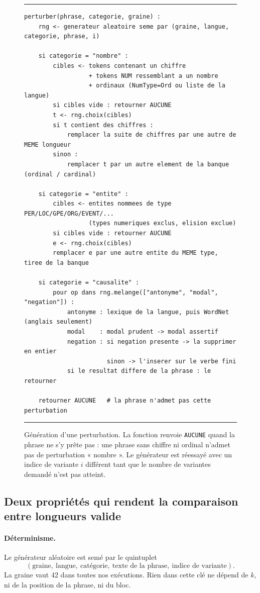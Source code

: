 \documentclass[11pt]{article}
\newcommand{\code}[1]{\texttt{\small #1}}
\begin{document}
\begin{figure}[t]
\small
\hrule\vspace{4pt}
\begin{verbatim}
perturber(phrase, categorie, graine) :
    rng <- generateur aleatoire seme par (graine, langue, categorie, phrase, i)

    si categorie = "nombre" :
        cibles <- tokens contenant un chiffre
                  + tokens NUM ressemblant a un nombre
                  + ordinaux (NumType=Ord ou liste de la langue)
        si cibles vide : retourner AUCUNE
        t <- rng.choix(cibles)
        si t contient des chiffres :
            remplacer la suite de chiffres par une autre de MEME longueur
        sinon :
            remplacer t par un autre element de la banque (ordinal / cardinal)

    si categorie = "entite" :
        cibles <- entites nommees de type PER/LOC/GPE/ORG/EVENT/...
                  (types numeriques exclus, elision exclue)
        si cibles vide : retourner AUCUNE
        e <- rng.choix(cibles)
        remplacer e par une autre entite du MEME type, tiree de la banque

    si categorie = "causalite" :
        pour op dans rng.melange(["antonyme", "modal", "negation"]) :
            antonyme : lexique de la langue, puis WordNet (anglais seulement)
            modal    : modal prudent -> modal assertif
            negation : si negation presente -> la supprimer en entier
                       sinon -> l'inserer sur le verbe fini
            si le resultat differe de la phrase : le retourner

    retourner AUCUNE   # la phrase n'admet pas cette perturbation
\end{verbatim}
\vspace{2pt}\hrule
\caption{Génération d'une perturbation. La fonction renvoie \code{AUCUNE} quand la phrase ne s'y prête pas : une phrase sans chiffre ni ordinal n'admet pas de perturbation « nombre ». Le générateur est réessayé avec un indice de variante $i$ différent tant que le nombre de variantes demandé n'est pas atteint.}
\label{fig:pseudo}
\end{figure}

\subsection{Deux propriétés qui rendent la comparaison entre longueurs valide}

\paragraph{Déterminisme.}
Le générateur aléatoire est semé par le quintuplet
\[
(\text{graine},\ \text{langue},\ \text{catégorie},\ \text{texte de la phrase},\ \text{indice de variante}).
\]
La graine vaut 42 dans toutes nos exécutions.
Rien dans cette clé ne dépend de $k$, ni de la position de la phrase, ni du bloc.
\end{document}
